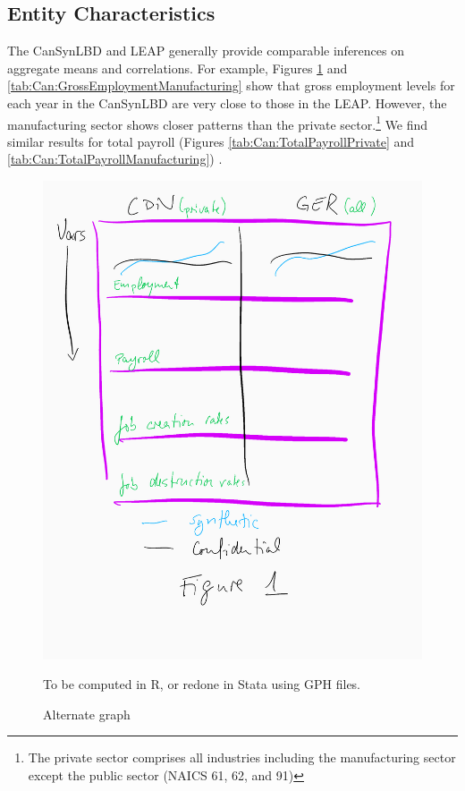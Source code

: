 
\newcommand{\CanTableNote}{$LEAP$ is the Longitudinal Employment Analysis Program and $CanSynLBD$ is the Canadian synthetic database based on LEAP. }

\subsection{Entity Characteristics}

The CanSynLBD and LEAP generally provide comparable inferences on aggregate means and correlations. For example, Figures \ref{tab:Can:GrossEmploymentPrivate} and \ref{tab:Can:GrossEmploymentManufacturing} show that gross employment levels for each year in the CanSynLBD are very close to those in the LEAP. However, the manufacturing sector shows closer patterns than the private sector.\footnote{The private sector comprises all industries including the manufacturing sector except the public sector  (NAICS 61, 62, and 91)} We find similar results for total payroll (Figures \ref{tab:Can:TotalPayrollPrivate} and  \ref{tab:Can:TotalPayrollManufacturing}) .

\begin{figure} [H]
\centering
\label{tab:Can:GrossEmploymentPrivate}
\includegraphics[width=.8\linewidth]{graphs/Figure1-placeholder.png} 
\caption{Alternate graph} 
\begin{minipage}{0.48\linewidth}
{\footnotesize To be computed in R, or redone in Stata using GPH files. \par}
\end{minipage}
\end{figure}

